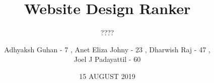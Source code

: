 \documentclass[11pt]{beamer}
\begin{document}
	\title{\textbf{Website Design Ranker}}
	\subtitle{????}
	\date{15 AUGUST 2019}
	\author{{\scriptsize Adhyaksh Guhan - 7 , Anet Eliza Johny - 23 , Dharwish Raj - 47 , \\ Joel J Padayattil - 60}}
	\begin{frame}[plain]
	\maketitle
\end{frame}
\end{document}
